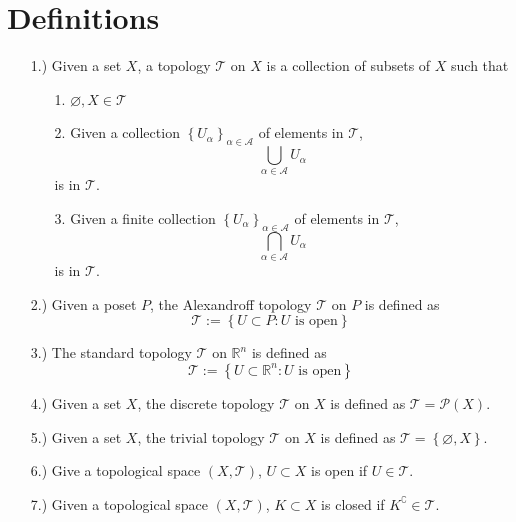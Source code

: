 \documentclass[11pt]{article}
\newcommand{\braces}[1]{\left\{#1\right\}}           %
\newcommand{\R}{\mathbb{R}}
\begin{document}
\pagestyle{fancy}
\fancyhead{}

\normalsize

\section*{Definitions}
\begin{itemize}
    \item [1.)] Given a set $X$, a topology $\mathcal{T}$ on $X$ is a collection of subsets of $X$ such that
    \begin{itemize}
        \item[1.] $\varnothing,X\in\mathcal{T}$

        \item[2.] Given a collection $\braces{U_\alpha}_{\alpha\in\mathcal{A}}$ of elements in $\mathcal{T}$,
        \[\bigcup_{\alpha\in\mathcal{A}}U_\alpha\]
        is in $\mathcal{T}$.

        \item[3.] Given a finite collection $\braces{U_\alpha}_{\alpha\in\mathcal{A}}$ of elements in $\mathcal{T}$,
        \[\bigcap_{\alpha\in\mathcal{A}}U_\alpha\]
        is in $\mathcal{T}$.
    \end{itemize}

    \item [2.)] Given a poset $P$, the Alexandroff topology $\mathcal{T}$ on $P$ is defined as
    \[\mathcal{T}:=\braces{U\subset P:U\text{ is open}}\]

    \item [3.)] The standard topology $\mathcal{T}$ on $\R^n$ is defined as
    \[\mathcal{T}:=\braces{U\subset\R^n:U\text{ is open}}\]

    \item [4.)] Given a set $X$, the discrete topology $\mathcal{T}$ on $X$ is defined as $\mathcal{T}=\mathcal{P}(X)$.

    \item [5.)] Given a set $X$, the trivial topology $\mathcal{T}$ on $X$ is defined as $\mathcal{T}=\braces{\varnothing,X}$.

    \item [6.)] Give a topological space $(X,\mathcal{T})$, $U\subset X$ is open if $U\in\mathcal{T}$.

    \item [7.)] Given a topological space $(X,\mathcal{T})$, $K\subset X$ is closed if $K^\complement\in\mathcal{T}$.


\end{itemize}
\end{document}
